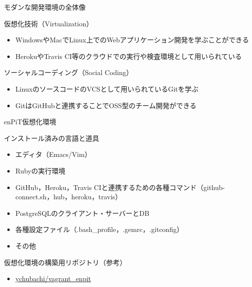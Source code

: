 \documentclass[t, aspectratio=169]{beamer}
\begin{document}
\begin{frame}[label=sec-1-4-4]{モダンな開発環境の全体像}
\begin{block}{仮想化技術（Virtualization）}
\begin{itemize}
\item WindowsやMacでLinux上でのWebアプリケーション開発を学ぶことができる
\item HerokuやTravis CI等のクラウドでの実行や検査環境として用いられている
\end{itemize}
\end{block}
\begin{block}{ソーシャルコーディング（Social Coding）}
\begin{itemize}
\item LinuxのソースコードのVCSとして用いられているGitを学ぶ
\item GitはGitHubと連携することでOSS型のチーム開発ができる
\end{itemize}
\end{block}
\end{frame}

\begin{frame}[label=sec-1-4-5]{enPiT仮想化環境}
\begin{block}{インストール済みの言語と道具}
\begin{itemize}
\item エディタ（Emacs/Vim）
\item Rubyの実行環境
\item GitHub，Heroku，Travis CIと連携するための各種コマンド（github-connect.sh，hub，heroku，travis）
\item PostgreSQLのクライアント・サーバーとDB
\item 各種設定ファイル（.bash\_profile，.gemrc，.gitconfig）
\item その他
\end{itemize}
\end{block}
\begin{block}{仮想化環境の構築用リポジトリ（参考）}
\begin{itemize}
\item \href{https://github.com/ychubachi/vagrant_enpit}{ychubachi/vagrant\_enpit}
\end{itemize}
\end{block}
\end{frame}
\end{document}
